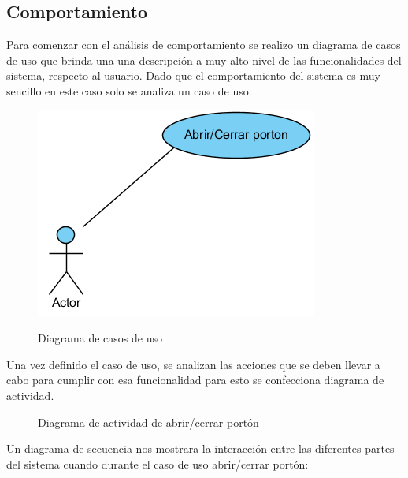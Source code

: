 \documentclass[16pt, article,notitlepage]{article}
\begin{document}
\subsection{Comportamiento}
Para comenzar con el análisis de comportamiento se realizo un diagrama de casos de uso que brinda una una descripción a muy alto nivel de las funcionalidades del sistema, respecto al usuario. Dado que el comportamiento del sistema es muy sencillo en este caso solo se analiza un caso de uso.
\begin{figure}[H]
	\centering 
	{\includegraphics[width=0.3\linewidth]{./images/CasosDeUso.png}}
	\caption{Diagrama de casos de uso}
\end{figure}
Una vez definido el caso de uso, se analizan las acciones que se deben llevar a cabo para cumplir con esa funcionalidad para esto se confecciona diagrama de actividad.
\begin{figure}[H]
	\caption{Diagrama de actividad de abrir/cerrar portón}
\end{figure}
Un diagrama de secuencia nos mostrara la interacción entre las diferentes partes del sistema cuando durante el caso de uso abrir/cerrar portón:
\end{document}
